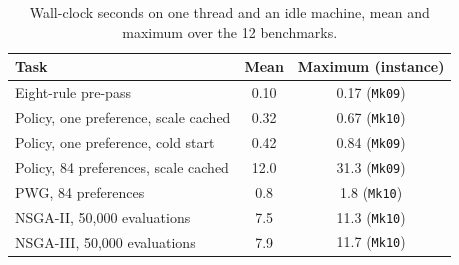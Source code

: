 \begin{table}[htbp]
\centering
\caption{Wall-clock seconds on one thread and an idle machine, mean and maximum over the 12 benchmarks.}
\label{tab:runtime}
\small
\begin{tabular}{lcc}
\toprule
Task & Mean & Maximum (instance) \\
\midrule
Eight-rule pre-pass & 0.10 & 0.17 (\texttt{Mk09}) \\
Policy, one preference, scale cached & 0.32 & 0.67 (\texttt{Mk10}) \\
Policy, one preference, cold start & 0.42 & 0.84 (\texttt{Mk09}) \\
Policy, 84 preferences, scale cached & 12.0 & 31.3 (\texttt{Mk09}) \\
PWG, 84 preferences & 0.8 & 1.8 (\texttt{Mk10}) \\
NSGA-II, 50{,}000 evaluations & 7.5 & 11.3 (\texttt{Mk10}) \\
NSGA-III, 50{,}000 evaluations & 7.9 & 11.7 (\texttt{Mk10}) \\
\bottomrule
\end{tabular}
\end{table}
